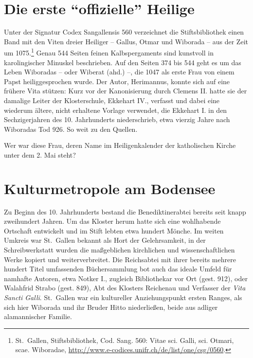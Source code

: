 \documentclass[a4paper,
fontsize=11pt,
oneside,
numbers=noperiodatend,
parskip=half-,
bibliography=totoc,
final
]{scrartcl}
\begin{document}
\section*{Die erste \enquote{offizielle}
Heilige}\label{die-erste-offizielle-heilige}

Unter der Signatur Codex Sangallensis 560 verzeichnet die
Stiftsbibliothek einen Band mit den Viten dreier Heiliger -- Gallus,
Otmar und Wiborada -- aus der Zeit um 1075.\footnote{St.~Gallen,
  Stiftsbibliothek, Cod. Sang. 560: Vitae sci. Galli, sci. Otmari, scae.
  Wiboradae, \url{http://www.e-codices.unifr.ch/de/list/one/csg/0560}.}
Genau 544 Seiten feinen Kalbspergaments sind kunstvoll in karolingischer
Minuskel beschrieben. Auf den Seiten 374 bis 544 geht es um das Leben
Wiboradas -- oder Wiberat (ahd.) --, die 1047 als erste Frau von einem
Papst heiliggesprochen wurde. Der Autor, Herimannus, konnte sich auf
eine frühere Vita stützen: Kurz vor der Kanonisierung durch Clemens II.
hatte sie der damalige Leiter der Klosterschule, Ekkehart IV., verfasst
und dabei eine wiederum ältere, nicht erhaltene Vorlage verwendet, die
Ekkehart I. in den Sechzigerjahren des 10. Jahrhunderts niederschrieb,
etwa vierzig Jahre nach Wiboradas Tod 926. So weit zu den Quellen.

Wer war diese Frau, deren Name im Heiligenkalender der katholischen
Kirche unter dem 2. Mai steht?

\section*{Kulturmetropole am
Bodensee}\label{kulturmetropole-am-bodensee}

Zu Beginn des 10. Jahrhunderts bestand die Benediktinerabtei bereits
seit knapp zweihundert Jahren. Um das Kloster herum hatte sich eine
wohlhabende Ortschaft entwickelt und im Stift lebten etwa hundert
Mönche. Im weiten Umkreis war St.~Gallen bekannt als Hort der
Gelehrsamkeit, in der Schreibwerkstatt wurden die maßgeblichen
kirchlichen und wissenschaftlichen Werke kopiert und weiterverbreitet.
Die Reichsabtei mit ihrer bereits mehrere hundert Titel umfassenden
Büchersammlung bot auch das ideale Umfeld für namhafte Autoren, etwa
Notker I., zugleich Bibliothekar vor Ort (gest. 912), oder Walahfrid
Strabo (gest. 849), Abt des Klosters Reichenau und Verfasser der
\emph{Vita Sancti Galli}. St.~Gallen war ein kultureller Anziehungspunkt
ersten Ranges, als sich hier Wiborada und ihr Bruder Hitto niederließen,
beide aus adliger alamannischer Familie.
\end{document}
